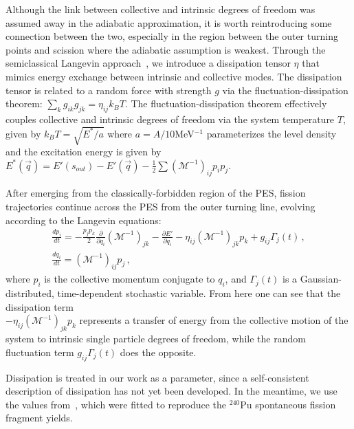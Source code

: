 Although the link between collective and intrinsic degrees of freedom was assumed away in the adiabatic approximation, it is worth reintroducing some connection between the two, especially in the region between the outer turning points and scission where the adiabatic assumption is weakest. Through the semiclassical Langevin approach~\cite{Abe1996,Frobrich1998,Sadhukhan2016}, we introduce a dissipation tensor $\eta$ that mimics energy exchange between intrinsic and collective modes. The dissipation tensor is related to a random force with strength $g$ via the fluctuation-dissipation theorem: $\sum_k g_{ik}g_{jk} = \eta_{ij}k_BT$. The fluctuation-dissipation theorem effectively couples collective and intrinsic degrees of freedom via the system temperature $T$, given by $k_BT = \sqrt{E^*/a}$ where $a=A/10$MeV$^{-1}$ parameterizes the level density and the excitation energy is given by $E^*(\vec{q}) = E'(s_{out}) - E'(\vec{q}) - \frac{1}{2}\sum\left(\mathcal{M}^{-1}\right)_{ij}p_i p_j$.

After emerging from the classically-forbidden region of the PES, fission trajectories continue across the PES from the outer turning line, evolving according to the Langevin equations:
\begin{gather}\label{eq:langevin} 
	\frac{dp_i}{dt} =  
	-\frac{p_j p_k}{2} \frac{\partial}{\partial q_i}\left(\mathcal{M}^{-1}\right)_{jk} 
	- \frac{\partial E'}{\partial q_i}  - \eta_{ij}\left(\mathcal{M}^{-1}\right)_{jk} p_k + g_{ij}\Gamma_j(t) \,, \\ 
	\frac{dq_i}{dt} = 	\left(\mathcal{M}^{-1}\right)_{ij} p_j \,,  
\end{gather} 
\noindent where $p_i$ is the collective momentum conjugate to $q_i$, and $\Gamma_j(t)$ is a Gaussian-distributed, time-dependent stochastic variable. From here one can see that the dissipation term\\\noindent $- \eta_{ij}\left(\mathcal{M}^{-1}\right)_{jk} p_k$ represents a transfer of energy from the collective motion of the system to intrinsic single particle degrees of freedom, while the random fluctuation term $g_{ij}\Gamma_j(t)$ does the opposite.

Dissipation is treated in our work as a parameter, since a self-consistent description of dissipation has not yet been developed.  In the meantime, we use the values from~\cite{Sadhukhan2016}, which were fitted to reproduce the $^{240}$Pu spontaneous fission fragment yields.%


